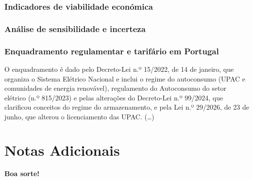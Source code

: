 \subsubsection{Indicadores de viabilidade económica }
\label{sec:Ch2.5.2}

\subsubsection{Análise de sensibilidade e incerteza}
\label{sec:Ch2.5.3}



\subsubsection{Enquadramento regulamentar e tarifário em Portugal}
\label{sec:Ch2.6}

O enquadramento é dado pelo Decreto-Lei n.º 15/2022, de 14 de janeiro, que organiza o Sistema Elétrico Nacional e inclui o regime do autoconsumo (UPAC e comunidades de energia renovável), regulamento do Autoconsumo do setor elétrico (n.º 815/2023) e pelas alterações do Decreto-Lei n.º 99/2024, que clarificou conceitos do regime do armazenamento, e pela Lei n.º 29/2026, de 23 de junho, que alterou o licenciamento das UPAC. (…)

\section{Notas Adicionais}

\textbf{Boa sorte!}

